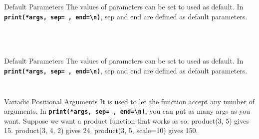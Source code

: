         \begin{frame}{Default Parameters}
            The values of parameters can be set to used as default.
            \newline
            In \textbf{\texttt{print(*args, sep=\textquotesingle \ \textquotesingle, end=\textquotesingle \textbackslash n\textquotesingle )}}, 
            sep and end are defined as default parameters.
            \inputminted[frame=single,framesep=2pt, lastline=15]{python3}{code-examples/default.py}
            \begin{columns}
                \begin{column}{0.50\textwidth}
                    \inputminted[frame=single,framesep=2pt, lastline=15]{python3}{code-examples/valid1.py}  
                \end{column}
                \begin{column}{0.50\textwidth}
                    \inputminted[frame=single,framesep=2pt, lastline=15]{python3}{code-examples/valid1_1.py}                    
                \end{column}
            \end{columns}
        \end{frame}

        \begin{frame}{Default Parameters}
            The values of parameters can be set to used as default.
            \newline
            In \textbf{\texttt{print(*args, sep=\textquotesingle \ \textquotesingle, end=\textquotesingle \textbackslash n\textquotesingle )}}, 
            sep and end are defined as default parameters.
            \inputminted[frame=single,framesep=2pt, lastline=15]{python3}{code-examples/default.py}
            \inputminted[frame=single,framesep=2pt, lastline=15]{python3}{code-examples/valid2.py}  
        \end{frame}

        \begin{frame}{Variadic Positional Arguments}
            It is used to let the function accept any number of arguments.
            \newline
            In \textbf{\texttt{print(*args, sep=\textquotesingle \ \textquotesingle, end=\textquotesingle \textbackslash n\textquotesingle )}}, 
            you can put as many args as you want.
            \newline 
            \newline Suppose we want a product function that works as so:
            \newline product(3, 5) gives 15.
            \newline product(3, 4, 2) gives 24.
            \newline product(3, 5, scale=10) gives 150.
            \newline 
            \inputminted[frame=single,framesep=2pt, lastline=15]{python3}{code-examples/variadic.py}
        \end{frame}

